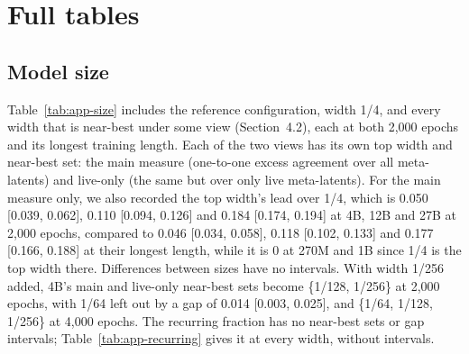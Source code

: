\section{Full tables}

\subsection{Model size}
Table~\ref{tab:app-size} includes the reference configuration, width 1/4, and every width that is near-best under some view (Section~4.2), each at both 2,000 epochs and its longest training length.
Each of the two views has its own top width and near-best set: the main measure (one-to-one excess agreement over all meta-latents) and live-only (the same but over only live meta-latents).
For the main measure only, we also recorded the top width's lead over 1/4, which is 0.050 [0.039, 0.062], 0.110 [0.094, 0.126] and 0.184 [0.174, 0.194] at 4B, 12B and 27B at 2,000 epochs, compared to 0.046 [0.034, 0.058], 0.118 [0.102, 0.133] and 0.177 [0.166, 0.188] at their longest length, while it is 0 at 270M and 1B since 1/4 is the top width there.
Differences between sizes have no intervals.
With width 1/256 added, 4B's main and live-only near-best sets become \{1/128, 1/256\} at 2,000 epochs, with 1/64 left out by a gap of 0.014 [0.003, 0.025], and \{1/64, 1/128, 1/256\} at 4,000 epochs.
The recurring fraction has no near-best sets or gap intervals; Table~\ref{tab:app-recurring} gives it at every width, without intervals.

